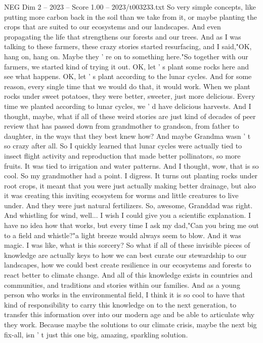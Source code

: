 \begin{textsample}{NEG Dim 2 – 2023 – Score 1.00 – 2023/t003233.txt}
So very simple concepts, like putting more carbon back in the soil than we take from it, or maybe planting the crops that are suited to our ecosystems and our landscapes.
And even propagating the life that strengthens our forests and our trees.
And as I was talking to these farmers, these crazy stories started resurfacing, and I said,"OK, hang on, hang on.
Maybe they ' re on to something here."So together with our farmers, we started kind of trying it out.
OK, let ' s plant some rocks here and see what happens.
OK, let ' s plant according to the lunar cycles.
And for some reason, every single time that we would do that, it would work.
When we plant rocks under sweet potatoes, they were better, sweeter, just more delicious.
Every time we planted according to lunar cycles, we ' d have delicious harvests.
And I thought, maybe, what if all of these weird stories are just kind of decades of peer review that has passed down from grandmother to grandson, from father to daughter, in the ways that they best knew how?
And maybe Grandma wasn ' t so crazy after all.
So I quickly learned that lunar cycles were actually tied to insect flight activity and reproduction that made better pollinators, so more fruits.
It was tied to irrigation and water patterns.
And I thought, wow, that is so cool.
So my grandmother had a point.
I digress.
It turns out planting rocks under root crops, it meant that you were just actually making better drainage, but also it was creating this inviting ecosystem for worms and little creatures to live under.
And they were just natural fertilizers.
So, awesome, Granddad was right.
And whistling for wind, well...
I wish I could give you a scientific explanation.
I have no idea how that works, but every time I ask my dad,"Can you bring me out to a field and whistle?"a light breeze would always seem to blow.
And it was magic.
I was like, what is this sorcery?
So what if all of these invisible pieces of knowledge are actually keys to how we can best curate our stewardship to our landscapes, how we could best create resilience in our ecosystems and forests to react better to climate change.
And all of this knowledge exists in countries and communities, and traditions and stories within our families.
And as a young person who works in the environmental field, I think it is so cool to have that kind of responsibility to carry this knowledge on to the next generation, to transfer this information over into our modern age and be able to articulate why they work.
Because maybe the solutions to our climate crisis, maybe the next big fix-all, isn ' t just this one big, amazing, sparkling solution.

\end{textsample}
